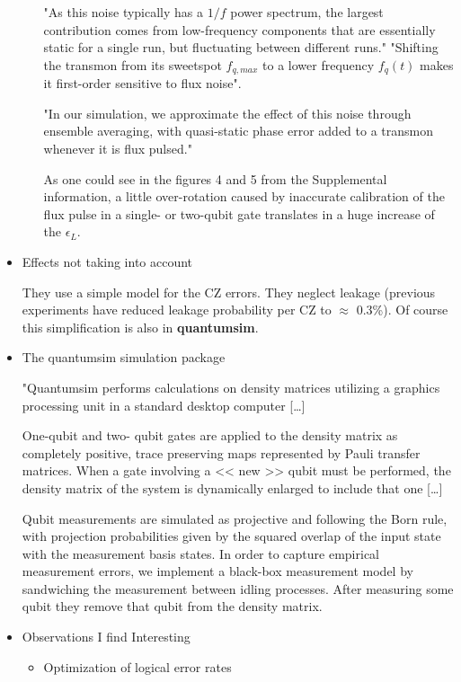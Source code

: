 \begin{itemize}
\begin{itemize}
"As this noise typically has a \(1/f\) power spectrum, the largest contribution comes from low-frequency components that are essentially static for a single run, but fluctuating between different runs."
"Shifting the transmon from its sweetspot \(f_{q,max}\) to a lower frequency \(f_q (t)\) makes it first-order sensitive to flux noise".

"In our simulation, we approximate the effect of this noise through ensemble averaging, with quasi-static phase error added to a transmon whenever it is flux pulsed."

As one could see in the figures 4 and 5 from the Supplemental information, a little over-rotation  caused by inaccurate calibration of the flux pulse in a single- or two-qubit gate translates in a huge increase of the \(\epsilon_L\).
\end{itemize}


\item Effects not taking into account
\label{sec:org1284f33}

They use a simple model for the CZ errors.
They neglect leakage (previous experiments have reduced leakage probability per CZ to \(\approx\) 0.3\%).
Of course this simplification is also in \textbf{quantumsim}.

\item The quantumsim simulation package
\label{sec:org9136d7b}

"Quantumsim performs calculations on density matrices utilizing a graphics processing unit in a standard desktop computer [\ldots{}]

One-qubit and two- qubit gates are applied to the density matrix as completely positive, trace preserving maps represented by Pauli transfer matrices. When a gate involving a << new >> qubit must be performed, the density matrix of the system is dynamically enlarged to include that one [\ldots{}]

Qubit measurements are simulated as projective and following the Born rule, with projection probabilities given by the squared overlap of the input state with the measurement basis states. In order to capture empirical measurement errors, we implement a black-box measurement model by sandwiching the measurement between idling processes. After measuring some qubit they remove that qubit from the density matrix.


\item Observations I find Interesting
\label{sec:orgff9ec73}
\begin{itemize}
\item Optimization of logical error rates
\label{sec:org248fcaa}


\end{itemize}
\end{itemize}
